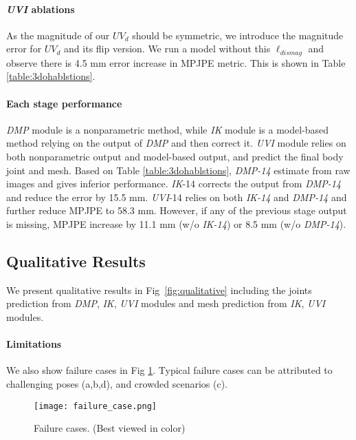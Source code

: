 \documentclass[10pt,twocolumn,letterpaper]{article}
\begin{document}
\paragraph{\textit{UVI} ablations} As the magnitude of our $UV_{d}$ should be symmetric, we introduce the magnitude error for $UV_{d}$ and its flip version.  We run a model without this $\ell_{dismag}$ and  observe there is 4.5 mm error increase in MPJPE metric. This is shown in Table \ref{table:3dohablstions}. 

\paragraph{Each stage performance} \textit{DMP} module is a nonparametric method, while \textit{IK} module is a model-based method relying on the output of \textit{DMP} and then correct it. \textit{UVI} module relies on both nonparametric output and model-based output, and predict the final body joint and mesh. Based on Table \ref{table:3dohablstions}, \textit{DMP-14} estimate from raw images and gives inferior performance.  \textit{IK}-14 corrects the output from \textit{DMP-14} and reduce the error by 15.5 mm. \textit{UVI}-14 relies on both \textit{IK-14} and \textit{DMP-14} and further reduce MPJPE to 58.3 mm. However, if any of the previous stage output is missing, MPJPE increase by 11.1 mm (w/o \textit{IK-14}) or 8.5 mm (w/o \textit{DMP-14}).















\subsection{Qualitative Results} 
We present qualitative results in Fig~\ref{fig:qualitative} including the joints prediction from \textit{DMP}, \textit{IK}, \textit{UVI} modules and mesh prediction from \textit{IK}, \textit{UVI} modules. 

\paragraph{Limitations} We also show failure cases in Fig \ref{fig:failurecases}. Typical failure cases can be attributed to challenging poses (a,b,d), and crowded scenarios (c). 

\begin{figure}
\centering
\texttt{[image: failure\_case.png]}
\caption{Failure cases. (Best viewed in color) }
\label{fig:failurecases}
\end{figure}
\end{document}
